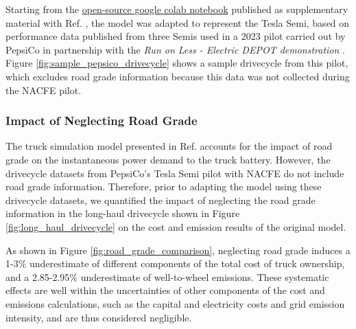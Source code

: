 Starting from the \href{https://colab.research.google.com/drive/124rFu_4vHx4cP6SODtdzCxnUmLY50wbW?usp=sharing}{open-source google colab notebook} published as supplementary material with Ref. \cite{Sader_2023}, the model was adapted to represent the Tesla Semi, based on performance data published from three Semis used in a 2023 pilot carried out by PepsiCo in partnership with the \textit{Run on Less - Electric DEPOT demonstration} \cite{NACFE_2023}. Figure \ref{fig:sample_pepsico_drivecycle} shows a sample drivecycle from this pilot, which excludes road grade information because this data was not collected during the NACFE pilot. 

\subsubsection{Impact of Neglecting Road Grade}

The truck simulation model presented in Ref. \cite{Sader_2023} accounts for the impact of road grade on the instantaneous power demand to the truck battery. However, the drivecycle datasets from PepsiCo's Tesla Semi pilot with NACFE do not include road grade information. Therefore, prior to adapting the model using these drivecycle datasets, we quantified the impact of neglecting the road grade information in the long-haul drivecycle shown in Figure \ref{fig:long_haul_drivecycle} on the cost and emission results of the original model. 

As shown in Figure \ref{fig:road_grade_comparison}, neglecting road grade induces a 1-3\% underestimate of different components of the total cost of truck ownership, and a 2.85-2.95\% underestimate of well-to-wheel emissions. These systematic effects are well within the uncertainties of other components of the cost and emissions calculations, such as the capital and electricity costs and grid emission intensity, and are thus considered negligible. 

